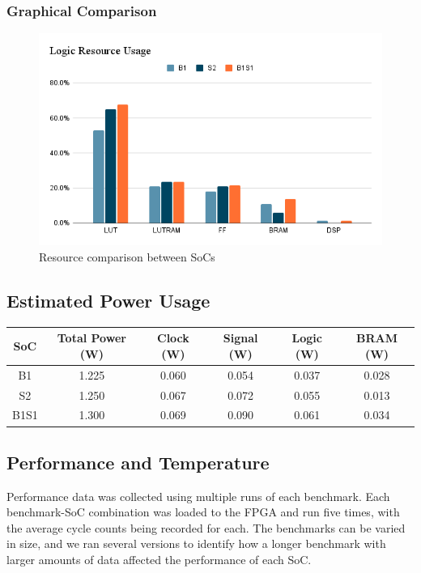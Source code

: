 \subsubsection{Graphical Comparison}
\begin{figure}[h!]
    \centering
    \includegraphics[width=\textwidth]{img/Logic Resource Usage.png}
    \caption{Resource comparison between SoCs}
    \label{fig:resource_soc_comp}
\end{figure}

\subsection{Estimated Power Usage}
\begin{center}
\begin{tabular}{c c c c c c}
    SoC & Total Power (W) & Clock (W) & Signal (W) & Logic (W) & BRAM (W) \\
    \hline
    B1 & 1.225 & 0.060 & 0.054 & 0.037 & 0.028 \\
    \hline
    S2 & 1.250 & 0.067 & 0.072 & 0.055 & 0.013 \\
    \hline
    B1S1 & 1.300 & 0.069 & 0.090 & 0.061 & 0.034 \\
    \hline
\end{tabular}
\end{center}

\subsection{Performance and Temperature}
Performance data was collected using multiple runs of each benchmark. Each benchmark-SoC combination was loaded to the FPGA and run five times, with the average cycle counts being recorded for each. The benchmarks can be varied in size, and we ran several versions to identify how a longer benchmark with larger amounts of data affected the performance of each SoC.

